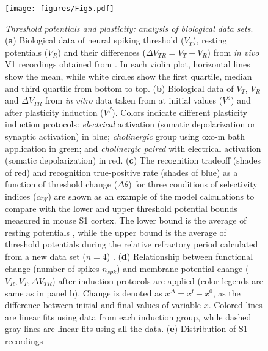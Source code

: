 \begin{figure}[H]
    \centering
    \texttt{[image: figures/Fig5.pdf]}
    \caption{
    \textit{Threshold potentials and plasticity: analysis of biological data sets}.
    (\textbf{a}) Biological data of
            neural spiking threshold ($V_T$),
            resting potentials ($V_R$)
            and their differences  ($\Delta V_{TR} = V_T - V_R$)
        from \textit{in vivo} V1 recordings
            obtained from \cite{Li2020-ej}.
        In each violin plot,
            horizontal lines show the mean,
            while white circles show
                the first quartile, median and third quartile from bottom to top.
    (\textbf{b}) Biological data of $V_T$, $V_R$ and $\Delta V_{TR}$
        from \textit{in vitro} data taken from \cite{Gill2020-wy}
        at initial values ($V^0$)
        and after plasticity induction ($V^f$).
        Colors indicate different plasticity induction protocols:
            \textit{electrical} activation (somatic depolarization or synaptic activation) in blue;
            \textit{cholinergic} group using oxo-m bath application in green;
            and \textit{cholinergic paired} with electrical activation (somatic depolarization) in red.
    (\textbf{c}) The recognition tradeoff (shades of red)
            and recognition true-positive rate (shades of blue)
            as a function of threshold change ($\Delta\theta$)
            for three conditions of selectivity indices ($\alpha_W$)
        are shown as an example of the model calculations
            to compare with the lower and upper threshold potential bounds measured in mouse S1 cortex.
        The lower bound is the average of resting potentials
            ,
            while the upper bound is the average of threshold potentials
                during the relative refractory period calculated from a new data set ($n = 4$)
                .
    (\textbf{d}) Relationship between functional change (number of spikes $n_{spk}$)
            and membrane potential change ($V_R, V_T, \Delta V_{TR}$)
            after induction protocols are applied (color legends are same as in panel b).
        Change is denoted as
            $x^{\Delta} = x^{\mathrm{f}} - x^{\mathrm{0}}$,
            as the difference between initial and final values of variable $x$.
        Colored lines are linear fits using data from each induction group,
            while dashed gray lines are linear fits using all the data.
    (\textbf{e})
    Distribution of S1 recordings
}
\end{figure}
